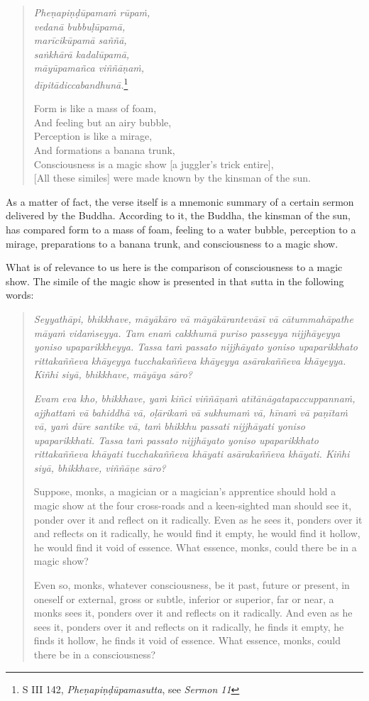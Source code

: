 \begin{quote}
\emph{Pheṇapiṇḍūpamaṁ rūpaṁ,}\\
\emph{vedanā bubbuḷūpamā,}\\
\emph{marīcikūpamā saññā,}\\
\emph{saṅkhārā kadalūpamā,}\\
\emph{māyūpamañca viññāṇaṁ,}\\
\emph{dīpitādiccabandhunā.}\footnote{S III 142, \emph{Pheṇapiṇḍūpamasutta}, see \emph{Sermon 11}}

Form is like a mass of foam,\\
And feeling but an airy bubble,\\
Perception is like a mirage,\\
And formations a banana trunk,\\
Consciousness is a magic show [a juggler's trick entire],\\
{[}All these similes{]} were made known by the kinsman of the sun.
\end{quote}

As a matter of fact, the verse itself is a mnemonic summary of a certain sermon delivered by the Buddha. According to it, the Buddha, the kinsman of the sun, has compared form to a mass of foam, feeling to a water bubble, perception to a mirage, preparations to a banana trunk, and consciousness to a magic show.

What is of relevance to us here is the comparison of consciousness to a magic show. The simile of the magic show is presented in that sutta in the following words:

\begin{quote}
\emph{Seyyathāpi, bhikkhave, māyākāro vā māyākārantevāsī vā cātummahāpathe māyaṁ vidaṁseyya. Tam enaṁ cakkhumā puriso passeyya nijjhāyeyya yoniso upaparikkheyya. Tassa taṁ passato nijjhāyato yoniso upaparikkhato rittakaññeva khāyeyya tucchakaññeva khāyeyya asārakaññeva khāyeyya. Kiñhi siyā, bhikkhave, māyāya sāro?}

\emph{Evam eva kho, bhikkhave, yaṁ kiñci viññāṇaṁ atītānāgatapaccuppannaṁ, ajjhattaṁ vā bahiddhā vā, oḷārikaṁ vā sukhumaṁ vā, hīnaṁ vā paṇītaṁ vā, yaṁ dūre santike vā, taṁ bhikkhu passati nijjhāyati yoniso upaparikkhati. Tassa taṁ passato nijjhāyato yoniso upaparikkhato rittakaññeva khāyati tucchakaññeva khāyati asārakaññeva khāyati. Kiñhi siyā, bhikkhave, viññāṇe sāro?}

Suppose, monks, a magician or a magician's apprentice should hold a magic show at the four cross-roads and a keen-sighted man should see it, ponder over it and reflect on it radically. Even as he sees it, ponders over it and reflects on it radically, he would find it empty, he would find it hollow, he would find it void of essence. What essence, monks, could there be in a magic show?

Even so, monks, whatever consciousness, be it past, future or present, in oneself or external, gross or subtle, inferior or superior, far or near, a monks sees it, ponders over it and reflects on it radically. And even as he sees it, ponders over it and reflects on it radically, he finds it empty, he finds it hollow, he finds it void of essence. What essence, monks, could there be in a consciousness?
\end{quote}
